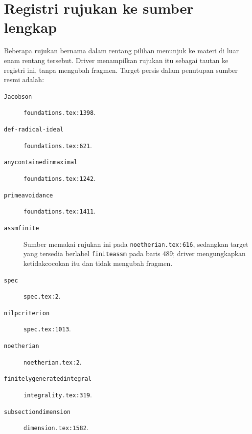 \documentclass[11pt,openany]{book}
\begin{document}
\chapter*{Registri rujukan ke sumber lengkap}
\label{cring-external-reference-registry}
Beberapa rujukan bernama dalam rentang pilihan menunjuk ke materi di luar enam
rentang tersebut. Driver menampilkan rujukan itu sebagai tautan ke registri ini,
tanpa mengubah fragmen. Target persis dalam penutupan sumber resmi adalah:
\begin{description}
\item[\texttt{Jacobson}] \texttt{foundations.tex:1398}.
\item[\texttt{def-radical-ideal}] \texttt{foundations.tex:621}.
\item[\texttt{anycontainedinmaximal}] \texttt{foundations.tex:1242}.
\item[\texttt{primeavoidance}] \texttt{foundations.tex:1411}.
\item[\texttt{assmfinite}] Sumber memakai rujukan ini pada
\texttt{noetherian.tex:616}, sedangkan target yang tersedia berlabel
\texttt{finiteassm} pada baris 489; driver mengungkapkan ketidakcocokan itu dan
tidak mengubah fragmen.
\item[\texttt{spec}] \texttt{spec.tex:2}.
\item[\texttt{nilpcriterion}] \texttt{spec.tex:1013}.
\item[\texttt{noetherian}] \texttt{noetherian.tex:2}.
\item[\texttt{finitelygeneratedintegral}] \texttt{integrality.tex:319}.
\item[\texttt{subsectiondimension}] \texttt{dimension.tex:1582}.
\end{description}




\printindex


\end{document}
